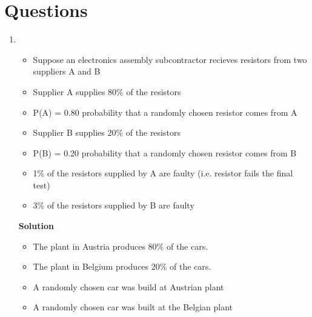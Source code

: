 \documentclass[]{report}
\begin{document}
\section{Questions}

\begin{enumerate}



\item 


\begin{itemize}
\item 
Suppose an electronics assembly subcontractor recieves resistors from two suppliers A and B

\item Supplier A supplies 80\% of the resistors

\item P(A) = 0.80 probability that a randomly chosen resistor comes from A

\item Supplier B supplies 20\% of the resistors

\item P(B) = 0.20 probability that a randomly chosen resistor comes from B

\end{itemize}

\begin{itemize}
\item 1\% of the resistors supplied by A are faulty (i.e. resistor fails the final test)
\item 3\% of the resistors supplied by B are faulty 
\end{itemize}


\noindent \textbf{Solution}

\begin{itemize}
\item The plant in Austria produces 80\% of the cars.

\item The plant in Belgium produces 20\% of the cars.

\item A randomly chosen car was build at Austrian plant

\item A randomly chosen car was built at the Belgian plant

\end{itemize}






\end{enumerate}
\end{document}
